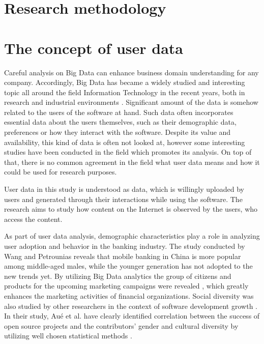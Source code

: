 \documentclass[conference]{IEEEtran}
\begin{document}
\section{Research methodology}

\section{The concept of user data}
Careful analysis on Big Data can enhance business domain understanding for any company. Accordingly, Big Data has became a widely studied and interesting topic all around the field Information Technology in the recent years, both in research and industrial environments \cite{inmon2007tapping, introtodatamining}. Significant amount of the data is somehow related to the users of the software at hand. Such data often incorporates essential data about the users themselves, such as their demographic data, preferences or how they interact with the software. Despite its value and availability, this kind of data is often not looked at, however some interesting studies have been conducted in the field which promotes its analysis. On top of that, there is no common agreement in the field what user data means and how it could be used for research purposes.

User data in this study is understood as data, which is willingly uploaded by users and generated through their interactions while using the software. The research aims to study how content on the Internet is observed by the users, who access the content.

As part of user data analysis, demographic characteristics play a role in analyzing user adoption and behavior in the banking industry. The study conducted by Wang and Petrounias \cite{chinesemobilebankingusers} reveals that mobile banking in China is more popular among middle-aged males, while the younger generation has not adopted to the new trends yet. By utilizing Big Data analytics the group of citizens and products for the upcoming marketing campaigns were revealed \cite{chinesemobilebankingusers}, which greatly enhances the marketing activities of financial organizations. Social diversity was also studied by other researchers in the context of software development growth \cite{socialdiversityongithub}. In their study, Aué et al. have clearly identified correlation between the success of open source projects and the contributors' gender and cultural diversity by utilizing well chosen statistical methods \cite{socialdiversityongithub}.
\end{document}
